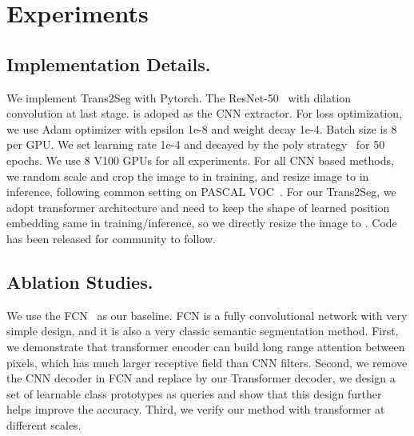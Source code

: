 \documentclass{article}
\begin{document}
\section{Experiments}
\subsection{Implementation Details.}
We implement Trans2Seg with Pytorch. The ResNet-50~\cite{resnet} with dilation convolution at last stage. is adoped as the CNN extractor. 
For loss optimization, we use Adam optimizer with epsilon 1e-8 and weight decay 1e-4. Batch size is 8 per GPU. We set learning rate 1e-4 and decayed by the poly strategy~\cite{bisenet} for 50 epochs. We use 8 V100 GPUs for all experiments. 
For all CNN based methods, we random scale and crop the image to  in training, and resize image to  in inference, following common setting on PASCAL VOC~\cite{voc}.
For our Trans2Seg, we adopt transformer architecture and need to keep the shape of learned position embedding same in training/inference, so we directly resize the image to .
Code has been released for community to follow.

\subsection{Ablation Studies.}
We use the FCN~\cite{fcn} as our baseline. FCN is a fully convolutional network with very simple design, and it is also a very classic semantic segmentation method.
First, we demonstrate that transformer encoder can build long range attention between pixels, which has much larger receptive field than CNN filters.
Second, we remove the CNN decoder in FCN and replace by our Transformer decoder, we design a set of learnable class prototypes as queries and show that this design further helps improve the accuracy.
Third, we verify our method with transformer at different scales. 
\end{document}
